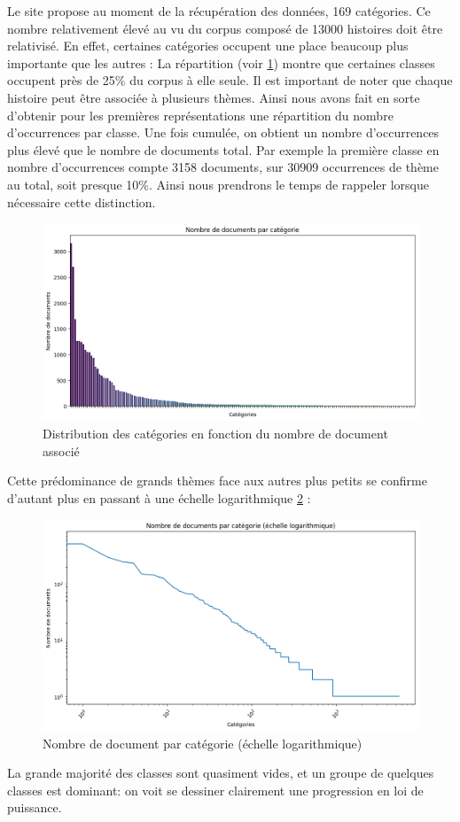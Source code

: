 \documentclass[12pt,a4paper,oneside,titlepage]{book} %
\begin{document}
Le site propose au moment de la récupération des données, 169 catégories. Ce nombre relativement élevé au vu du corpus composé de 13000 histoires doit être relativisé.
En effet, certaines catégories occupent une place beaucoup plus importante que les autres : 
La répartition (voir \ref{fig:rep_cat}) montre que certaines classes occupent près de 25\% du corpus à elle seule. 
Il est important de noter que chaque histoire peut être associée à plusieurs thèmes. Ainsi nous avons fait en sorte d'obtenir pour les premières représentations une répartition du nombre d’occurrences par classe. Une fois cumulée, on obtient un nombre d'occurrences plus élevé que le nombre de documents total. 
Par exemple la première classe en nombre d'occurrences compte 3158 documents, sur 30909 occurrences de thème au total, soit presque 10\%. Ainsi nous prendrons le temps de rappeler lorsque nécessaire cette distinction.

\begin{figure}
    \centering
    \includegraphics[width=0.5\linewidth]{illustration/rep_categories.png}
    \caption{Distribution des catégories en fonction du nombre de document associé}
    \label{fig:rep_cat}
\end{figure}

Cette prédominance de grands thèmes face aux autres plus petits se confirme d'autant plus en passant à une échelle logarithmique \ref{fig:log_log} : 

\begin{figure}
    \centering
    \includegraphics[width=0.5\linewidth]{illustration/log_log_cat.png}
    \caption{Nombre de document par catégorie (échelle logarithmique)}
    \label{fig:log_log}
\end{figure}
La grande majorité des classes sont quasiment vides, et un groupe de quelques classes est dominant: on voit se dessiner clairement une progression en loi de puissance. 
\end{document}
